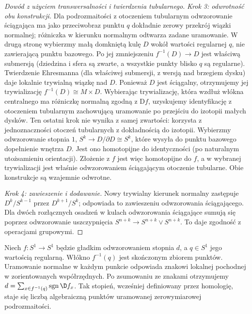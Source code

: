 \begin{proof}[Dowód z użyciem transwersalności i twierdzenia tubularnego]
\emph{Krok 3: odwrotność obu konstrukcji.}
Dla podrozmaitości z otoczeniem tubularnym odwzorowanie
ściągająca ma jako przeciwobraz punktu $q$ dokładnie
zerowy przekrój wiązki normalnej; różniczka w kierunku
normalnym odtwarza zadane uramowanie. W drugą stronę
wybierzmy małą domkniętą kulę $D$ wokół wartości
regularnej $q$, nie zawierającą punktu bazowego.
Po jej zmniejszeniu $f^{-1}(D)\to D$ jest właściwą
submersją (dziedzina i sfera są zwarte, a wszystkie
punkty blisko $q$ są regularne). Twierdzenie Ehresmanna (dla właściwej submersji,
z wersją nad brzegiem dysku) daje lokalnie trywialną
wiązkę nad $D$. Ponieważ $D$ jest ściągalny,
otrzymujemy jej trywializację $f^{-1}(D)\cong M\times D$.
Wybierając trywializację, która wzdłuż włókna centralnego
ma różniczkę normalną zgodną z $\mathrm{D}f$, uzyskujemy
identyfikację z otoczeniem tubularnym zachowującą
uramowanie po przejściu do izotopii małych dysków.
Ten ostatni krok nie wynika z samej zwartości: korzysta
z jednoznaczności otoczeń tubularnych z dokładnością
do izotopii.
Wybierzmy odwzorowanie stopnia $1$,
$S^k\to D/\partial D\cong S^k$, które wysyła
do punktu bazowego dopełnienie wnętrza $D$.
Jest ono homotopijne do identyczności (po naturalnym
utożsamieniu orientacji). Złożenie z $f$ jest więc
homotopijne do $f$, a w wybranej trywializacji
jest właśnie odwzorowaniem ściągającym otoczenie tubularne.
Obie konstrukcje są wzajemnie odwrotne.

\emph{Krok 4: zawieszenie i dodawanie.}
Nowy trywialny kierunek normalny zastępuje
$D^k/S^{k-1}$ przez $D^{k+1}/S^k$;
odpowiada to zawieszeniu odwzorowania ściągającego.
Dla dwóch rozłącznych osadzeń w kulach odwzorowania
ściągające sumują się poprzez odwzorowanie uszczypnięcia
$S^{n+k}\to S^{n+k}\vee S^{n+k}$. To daje
zgodność z operacjami grupowymi.
\end{proof}

\begin{przyklad}
Niech $f:S^1\to S^1$ będzie gładkim odwzorowaniem
stopnia $d$, a $q\in S^1$ jego wartością regularną.
Włókno $f^{-1}(q)$ jest skończonym zbiorem punktów.
Uramowanie normalne w każdym punkcie odpowiada znakowi
lokalnej pochodnej w zorientowanych współrzędnych.
Po zsumowaniu ze znakami otrzymujemy
$d=\sum_{x\in f^{-1}(q)}\operatorname{sgn}\D f_x$.
Tak stopień, wcześniej definiowany przez homologię,
staje się liczbą algebraiczną punktów uramowanej
zerowymiarowej podrozmaitości.
\end{przyklad}

